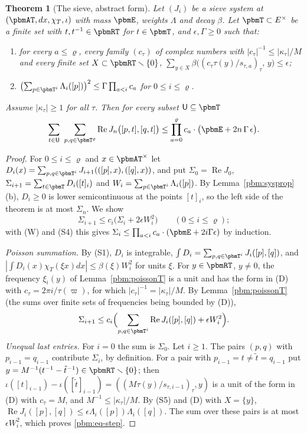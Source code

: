 \documentclass[10pt]{amsart}
\newtheorem{theorem}{Theorem}[section]
\theoremstyle{definition}
\theoremstyle{remark}
\newcommand{\Rel}{\operatorname{Re}}
\begin{document}
\begin{theorem}[The sieve, abstract form]\label{pbm:abstract}
Let $(J_i)$ be a sieve system at $(\pbmAT,dx,\chi_T,\iota)$ with mass $\pbmE$, weights $\Lambda$ and
decay $\beta$. Let $\pbmT\subset E^\times$ be a finite set with $t,t^{-1}\in\pbmRT$ for $t\in\pbmT$,
and $\epsilon,\Gamma\ge0$ such that:
\begin{enumerate}
\item[(D)] for every $a\le\varrho$, every family $(c_\tau)$ of complex numbers with $|c_\tau|^{-1}\le
|\kappa_\tau|/M$ and every finite set $X\subset\pbmRT\smallsetminus\{0\}$,
$\sum_{y\in X}\beta\bigl((c_\tau\tau(y)/s_{\tau,a})_\tau,\,y\bigr)\le\epsilon$;
\item[(W)] $\bigl(\sum_{p\in\pbmT^i}\Lambda_i([p])\bigr)^2\le\Gamma\prod_{a<i}c_a$ for $0\le i\le
\varrho$.
\end{enumerate}
Assume $|\kappa_\tau|\ge1$ for all $\tau$. Then for every subset $\mathsf U\subseteq\pbmT$
\[
\sum_{t\in\mathsf U}\ \sum_{p,q\in\pbmT^\varrho}\Rel J_n\bigl([p,t],[q,t]\bigr)\le\prod_{a=0}^{\varrho}c_a
\cdot\bigl(\pbmE+2n\,\Gamma\,\epsilon\bigr).
\]
\end{theorem}
\begin{proof}
For $0\le i\le\varrho$ and $x\in\pbmAT^\times$ let $D_i(x)=\sum_{p,q\in\pbmT^i}J_{i+1}(([p],x),([q],x))$,
and put $\Sigma_0=\Rel J_0$, $\Sigma_{i+1}=\sum_{t\in\pbmT}D_i([t]_i)$ and $W_i=\sum_{p\in\pbmT^i}\Lambda_i
([p])$. By Lemma~\ref{pbm:sysprop}(b), $D_i\ge0$ is lower semicontinuous at the points $[t]_i$, so
the left side of the theorem is at most $\Sigma_n$. We show
\begin{equation}\label{pbm:eq-step}
\Sigma_{i+1}\le c_i\bigl(\Sigma_i+2\epsilon W_i^2\bigr)\qquad(0\le i\le\varrho);
\end{equation}
with (W) and (S4) this gives $\Sigma_i\le\prod_{a<i}c_a\cdot(\pbmE+2i\Gamma\epsilon)$ by induction.

\emph{Poisson summation.} By (S1), $D_i$ is integrable, $\int D_i=\sum_{p,q\in\pbmT^i}J_i([p],[q])$,
and $|\int D_i(x)\chi_T(\xi x)dx|\le\beta(\xi)W_i^2$ for units $\xi$. For $y\in\pbmRT$, $y\ne0$, the
frequency $\xi_i(y)$ of Lemma~\ref{pbm:poissonT} is a unit and has the form in (D) with $c_\tau=2\pi
i/\tau(\varpi)$, for which $|c_\tau|^{-1}=|\kappa_\tau|/M$. By Lemma~\ref{pbm:poissonT} (the sums
over finite sets of frequencies being bounded by (D)),
\[
\Sigma_{i+1}\le c_i\Bigl(\sum_{p,q\in\pbmT^i}\Rel J_i([p],[q])+\epsilon W_i^2\Bigr).
\]
\emph{Unequal last entries.} For $i=0$ the sum is $\Sigma_0$. Let $i\ge1$. The pairs $(p,q)$ with
$p_{i-1}=q_{i-1}$ contribute $\Sigma_i$, by definition. For a pair with $p_{i-1}=t\ne\tilde t=q_{i-1}$ put
$y=M^{-1}(t^{-1}-\tilde t^{-1})\in\pbmRT\smallsetminus\{0\}$; then $\iota([t]_{i-1})-\iota([\tilde t]_{i-1})=((M\tau(
y)/s_{\tau,i-1})_\tau,y)$ is a unit of the form in (D) with $c_\tau=M$, and $M^{-1}\le|\kappa_\tau|/
M$. By (S5) and (D) with $X=\{y\}$, $\Rel J_i([p],[q])\le\epsilon\Lambda_i([p])\Lambda_i([q])$. The
sum over these pairs is at most $\epsilon W_i^2$, which proves \eqref{pbm:eq-step}.
\end{proof}
\end{document}
